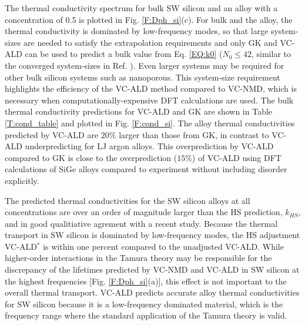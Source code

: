 \documentclass[12pt,twocolumn,iop]{/usr/share/texmf/tex/latex/iop/iopart}[/usr/share/texmf/tex/latex/iop/]
\begin{document}
The thermal conductivity spectrum for bulk SW silicon and an alloy 
with a concentration of 0.5 is plotted in Fig. \ref{F:Dph_si}(c). 
For bulk and the alloy, the thermal conductivity is dominated by 
low-frequency modes, so that large system-sizes are needed to satisfy 
the extrapolation requirements and only GK and VC-ALD can be used to 
predict a bulk value from Eq. \eqref{EQ:k0} ($N_0 \le 42$, similar 
to the converged system-sizes in Ref. \cite{he_lattice_2012}). Even larger 
systems may be required for other bulk silicon systems such as nanoporous.
\cite{}
This system-size requirement highlights the efficiency of the 
VC-ALD method compared to VC-NMD, which is necessary when 
computationally-expensive DFT calculations are used.
\cite{esfarjani_method_2008,garg_role_2011,tian_phonon_2012,lindsay_thermal_2012,esfarjani_heat_2011,chaput_phonon-phonon_2011}
The bulk thermal conductivity 
predictions for VC-ALD and GK are shown in Table \ref{T:cond_table} and 
plotted in Fig. \ref{F:cond_si}. The alloy thermal conductivities predicted 
by VC-ALD are $20\%$ larger than those from GK, in contrast to VC-ALD 
underpredicting for LJ argon alloys. This overprediction 
by VC-ALD compared to GK is close to the overprediction ($15\%$) of VC-ALD 
using DFT calculations of SiGe alloys compared to experiment 
without including disorder explicitly.\cite{garg_role_2011} 

The predicted thermal conductivities for the SW silicon alloys at 
all concentrations are over an order of magnitude larger than
the HS prediction, $k_{HS}$, and in good qualitiative agrement with a recent 
study.\cite{hori_phonon_2013} 
Because the thermal transport in SW silicon 
is dominated by low-frequency modes, the HS adjustment  
VC-ALD$^*$ is within one percent compared 
to the unadjusted VC-ALD. 
While higher-order interactions in the Tamura theory 
may be responsible for the 
discrepancy of the lifetimes predicted by VC-NMD and VC-ALD in SW silicon 
at the highest frequencies [Fig. \ref{F:Dph_si}(a)],  
this effect is not important to the overall
thermal transport. VC-ALD predicts accurate alloy thermal 
conductivities for SW silicon because it is a low-frequency 
dominated material, which is the frequency range where the standard 
application of the Tamura theory is valid.\cite{tamura_isotope_1983} 
\end{document}

